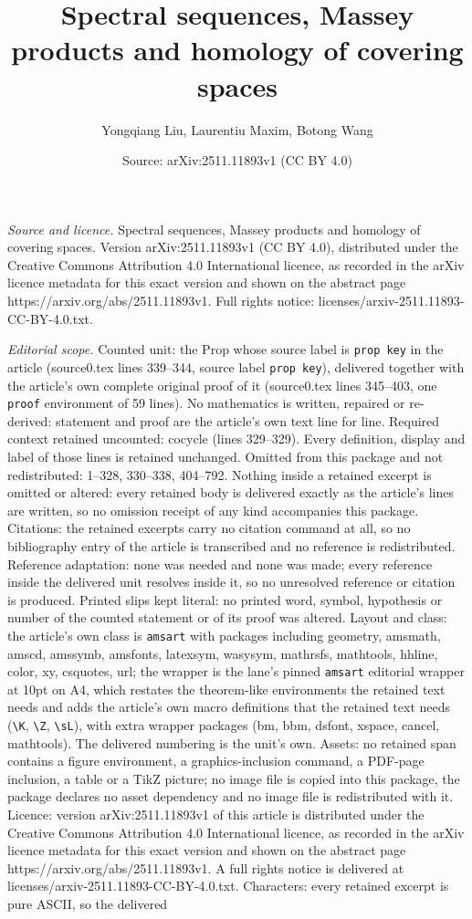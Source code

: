\documentclass[10pt,a4paper]{amsart}
\title[Spectral sequences, Massey products and homology of covering]{Spectral sequences, Massey products and homology of covering spaces}
\author{Yongqiang Liu, Laurentiu Maxim, Botong Wang}
\date{Source: arXiv:2511.11893v1 (CC BY 4.0)}
\begin{document}
\maketitle

\noindent\emph{Source and licence.} Spectral sequences, Massey products and homology of covering spaces. Version arXiv:2511.11893v1 (CC BY 4.0), distributed under the Creative Commons Attribution 4.0 International licence, as recorded in the arXiv licence metadata for this exact version and shown on the abstract page https://arxiv.org/abs/2511.11893v1. Full rights notice: licenses/arxiv-2511.11893-CC-BY-4.0.txt.\par\smallskip

\noindent\textit{Editorial scope.} Counted unit: the Prop whose source label is \texttt{prop key} in the article (source0.tex lines 339--344, source label \texttt{prop key}), delivered together with the article's own complete original proof of it (source0.tex lines 345--403, one \texttt{proof} environment of 59 lines). No mathematics is written, repaired or re-derived: statement and proof are the article's own text line for line. Required context retained uncounted: cocycle (lines 329--329). Every definition, display and label of those lines is retained unchanged. Omitted from this package and not redistributed: 1--328, 330--338, 404--792. Nothing inside a retained excerpt is omitted or altered: every retained body is delivered exactly as the article's lines are written, so no omission receipt of any kind accompanies this package. Citations: the retained excerpts carry no citation command at all, so no bibliography entry of the article is transcribed and no reference is redistributed. Reference adaptation: none was needed and none was made; every reference inside the delivered unit resolves inside it, so no unresolved reference or citation is produced. Printed slips kept literal: no printed word, symbol, hypothesis or number of the counted statement or of its proof was altered. Layout and class: the article's own class is \texttt{amsart} with packages including geometry, amsmath, amscd, amssymb, amsfonts, latexsym, wasysym, mathrsfs, mathtools, hhline, color, xy, csquotes, url; the wrapper is the lane's pinned \texttt{amsart} editorial wrapper at 10pt on A4, which restates the theorem-like environments the retained text needs and adds the article's own macro definitions that the retained text needs (\texttt{\textbackslash K}, \texttt{\textbackslash Z}, \texttt{\textbackslash sL}), with extra wrapper packages (bm, bbm, dsfont, xspace, cancel, mathtools). The delivered numbering is the unit's own. Assets: no retained span contains a figure environment, a graphics-inclusion command, a PDF-page inclusion, a table or a TikZ picture; no image file is copied into this package, the package declares no asset dependency and no image file is redistributed with it. Licence: version arXiv:2511.11893v1 of this article is distributed under the Creative Commons Attribution 4.0 International licence, as recorded in the arXiv licence metadata for this exact version and shown on the abstract page https://arxiv.org/abs/2511.11893v1. A full rights notice is delivered at licenses/arxiv-2511.11893-CC-BY-4.0.txt. Characters: every retained excerpt is pure ASCII, so the delivered 
\end{document}

